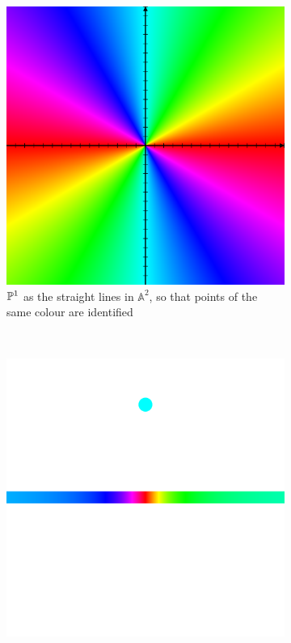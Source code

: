 \documentclass[10pt,a4paper,rgb]{article}
\newcommand{\A}{\mathbb{A}}
\begin{document}
\begin{figure}[H]
\centering
\begin{subfigure}{.5\textwidth}
\includegraphics[scale=.1]{plane.png}
\caption{$\P^1$ as the straight lines in $\A^2$, so that points of the same colour are identified}
\end{subfigure}\\
\begin{subfigure}{.4\textwidth}
\includegraphics[scale=.1]{line.png}

\end{subfigure}
\end{figure}
\end{document}
